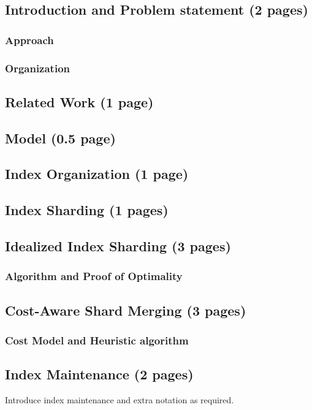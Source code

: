 \documentclass[12pt]{article}
\begin{document}
	\subsection{Introduction and Problem statement (2 pages)}
		\subsubsection{Approach}
		\subsubsection{Organization}


	\subsection{Related Work (1 page)}

	\subsection{Model (0.5 page)}

	\subsection{Index Organization (1 page)}

	\subsection{Index Sharding (1 pages)}

	\subsection{Idealized Index Sharding (3 pages)}
		\subsubsection{Algorithm and Proof of Optimality}

	\subsection{Cost-Aware Shard Merging (3 pages)}
		\subsubsection{Cost Model and Heuristic algorithm }

	\subsection{Index Maintenance (2 pages)}
		Introduce index maintenance and extra notation as required.
\end{document}
